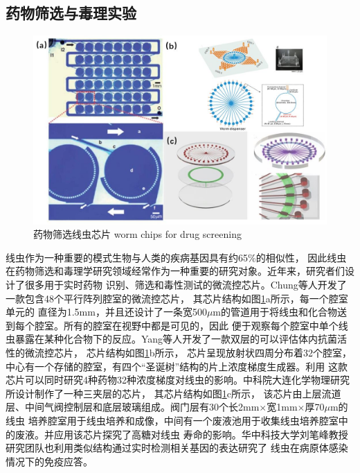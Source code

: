 \subsection{药物筛选与毒理实验}
\label{sec:intro:analog}
	\begin{figure}[b]
	  \centering
	  \includegraphics[width=12cm]{figure/chap1/screen.jpg}
	  \bicaption
		{药物筛选线虫芯片}
		{worm chips for drug screening}
	  \label{fig:screening}
	\end{figure}
	线虫作为一种重要的模式生物与人类的疾病基因具有约65\%的相似性\cite{Baumeister2002The,Sonnhammer1997Analysis}，
	因此线虫在药物筛选和毒理学研究领域经常作为一种重要的研究对象。近年来，研究者们设计了很多用于实时药物
	识别、筛选和毒性测试的微流控芯片。Chung等人\cite{Chung2011Microfluidic}开发了一款包含48个平行阵列腔室的微流控芯片，
	其芯片结构如图\ref{fig:screening}a所示，每一个腔室单元的
	直径为1.5mm，并且还设计了一条宽500$\mu$m的管道用于将线虫和化合物送到每个腔室。所有的腔室在视野中都是可见的，因此
	便于观察每个腔室中单个线虫暴露在某种化合物下的反应。Yang等人\cite{Yang2013An}开发了一款双层的可以评估体内抗菌活性的微流控芯片，
	芯片结构如图\ref{fig:screening}b所示，
	芯片呈现放射状四周分布着32个腔室，中心有一个存储的腔室，有四个“圣诞树”结构的片上浓度梯度生成器\cite{Dertinger2001Generation,Jeon2000Generation}。利用
	这款芯片可以同时研究4种药物32种浓度梯度对线虫的影响。中科院大连化学物理研究所设计制作了一种三夹层的芯片，
	其芯片结构如图\ref{fig:screening}c所示，
	该芯片由上层流道层、中间气阀控制层和底层玻璃组成。阀门层有30个长2mm$\times$宽1mm$\times$厚70$\mu$m的线虫
	培养腔室用于线虫培养和成像，中间有一个废液池用于收集线虫培养腔室中的废液。并应用该芯片探究了高糖对线虫
	寿命的影响\cite{zhuliguo2016}。华中科技大学刘笔峰教授研究团队也利用类似结构通过实时检测相关基因的表达研究了
	线虫在病原体感染情况下的免疫应答\cite{hu2018real}。

